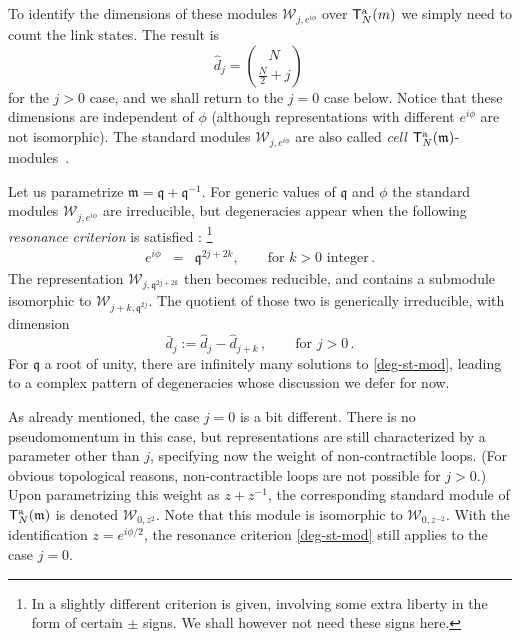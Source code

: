 \documentclass[a4paper,10pt]{article}
\newcommand{\q}{\mathfrak{q}}
\newcommand{\aSt}{\mathcal{W}}
\newcommand{\AStTL}[2]{\aSt_{#1,#2}}
\newcommand{\ATL}[1]{\mathsf{T}^{\rm a}_{#1}}
\newcommand{\m}{\mathfrak{m}}
\begin{document}
To identify the dimensions of these modules $\AStTL{j}{e^{i\phi}}$ over $\ATL{N}(m)$ we simply need to count the link states. The result is
 \begin{equation}\label{eq:dj}
 \hat{d}_{j}=
 \binom{N}{\frac{N}{2}+j}\,
 \end{equation}
for the $j>0$ case, and we shall return to the $j=0$ case below.
Notice that these dimensions are independent of $\phi$ (although representations with
different $e^{i\phi}$ are not isomorphic).
The standard modules $\AStTL{j}{e^{i\phi}}$ are also called
{\em cell} $\ATL{N}(\m)$-modules~\cite{GL}.
 
Let us parametrize $\m=\q+\q^{-1}$. For generic values of $\q$ and $\phi$ the standard modules $\AStTL{j}{e^{i\phi}}$ are irreducible,
but degeneracies appear when the following {\em resonance criterion} is satisfied \cite{MartinSaleur1,GL}:
\footnote{In \cite{GL} a slightly different criterion is given, involving some extra liberty in the form of certain $\pm$ signs. We shall however not need these signs here.}
%
 \begin{eqnarray}\label{deg-st-mod}
 e^{i\phi}&=&\q^{2j+2k},\qquad
 \mbox{for } k > 0 \mbox{ integer} \,.
 \end{eqnarray}
The representation $\AStTL{j}{\q^{2j+2k}}$ then becomes reducible, and contains a submodule isomorphic to 
 $\AStTL{j+k}{\q^{2j}}$. The quotient of those two is generically irreducible, with
 dimension
 \begin{equation} \label{bard}
  \bar{d}_j := \hat{d}_j-\hat{d}_{j+k} \,, \qquad \mbox{for } j > 0 \,.
 \end{equation}
%
For $\q$ a root of unity, there are infinitely many solutions to \eqref{deg-st-mod}, leading to a complex pattern of degeneracies whose discussion we defer for now.


As already mentioned, the case $j=0$ is a bit different. There is no pseudomomentum in this case, but representations are still characterized by a parameter other than $j$, specifying now the weight of non-contractible loops. (For obvious topological reasons, non-contractible loops are not possible for $j > 0$.) Upon parametrizing this weight as $z+z^{-1}$, the corresponding standard module of  $\ATL{N}(\m)$ is denoted  $\AStTL{0}{z^2}$. Note that this module is isomorphic to $\AStTL{0}{z^{-2}}$. With the identification $z = e^{i\phi/2}$, the resonance criterion \eqref{deg-st-mod} still applies to the case $j=0$.
\end{document}
